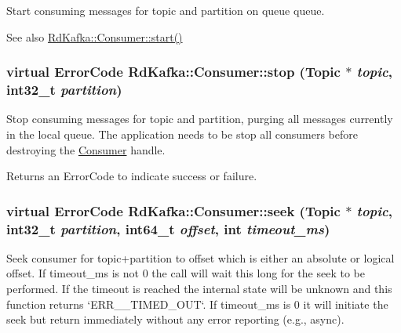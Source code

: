 Start consuming messages for topic and {\ttfamily partition} on queue {\ttfamily queue}. \begin{DoxySeeAlso}{See also}
\hyperlink{classRdKafka_1_1Consumer_ad2044e3433f626baff667e1a429d6f33}{RdKafka::Consumer::start()} 
\end{DoxySeeAlso}
\hypertarget{classRdKafka_1_1Consumer_a123ce138ca526ee1e5fafff09f14602b}{
\subsubsection[{stop}]{\setlength{\rightskip}{0pt plus 5cm}virtual ErrorCode RdKafka::Consumer::stop ({\bf Topic} $\ast$ {\em topic}, \/  int32\_\-t {\em partition})}}
\label{classRdKafka_1_1Consumer_a123ce138ca526ee1e5fafff09f14602b}


Stop consuming messages for topic and {\ttfamily partition}, purging all messages currently in the local queue. The application needs to be stop all consumers before destroying the \hyperlink{classRdKafka_1_1Consumer}{Consumer} handle.

\begin{DoxyReturn}{Returns}
an ErrorCode to indicate success or failure. 
\end{DoxyReturn}
\hypertarget{classRdKafka_1_1Consumer_ac7917098034f6c653aadb497df6ae1de}{
\subsubsection[{seek}]{\setlength{\rightskip}{0pt plus 5cm}virtual ErrorCode RdKafka::Consumer::seek ({\bf Topic} $\ast$ {\em topic}, \/  int32\_\-t {\em partition}, \/  int64\_\-t {\em offset}, \/  int {\em timeout\_\-ms})}}
\label{classRdKafka_1_1Consumer_ac7917098034f6c653aadb497df6ae1de}


Seek consumer for topic+partition to {\ttfamily offset} which is either an absolute or logical offset. If {\ttfamily timeout\_\-ms} is not 0 the call will wait this long for the seek to be performed. If the timeout is reached the internal state will be unknown and this function returns `ERR\_\-\_\-TIMED\_\-OUT`. If {\ttfamily timeout\_\-ms} is 0 it will initiate the seek but return immediately without any error reporting (e.g., async).


